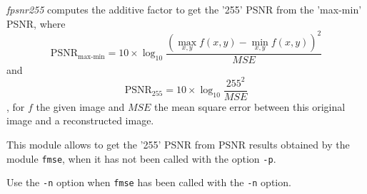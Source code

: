 {\em fpsnr255} computes the additive factor to get the '255' PSNR from the 
'max-min' PSNR, where
\[
\mbox{PSNR}_{\mbox{max-min}} = 
10 \times \log_{10} \frac{(\max_{x,y}f(x,y) - \min_{x,y}f(x,y))^{2}}{MSE}
\]
and 
\[
\mbox{PSNR}_{255} = 10 \times \log_{10} \frac{255^{2}}{MSE}
\],
for $f$ the given image and $MSE$ the mean square error between this original
image and a reconstructed image.

This module allows to get the '255' PSNR from PSNR results obtained by
the module \verb+fmse+, when it has not been called with the option \verb+-p+.

Use the \verb+-n+ option when \verb+fmse+ has been called with the 
\verb+-n+ option.
